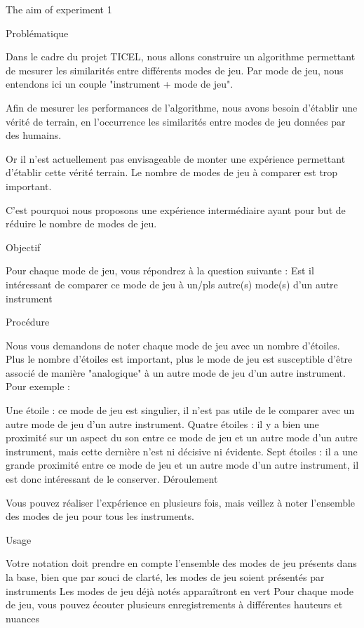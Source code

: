 \documentclass{article}
\begin{document}
The aim of experiment 1

Problématique

Dans le cadre du projet TICEL, nous allons construire un algorithme permettant de mesurer les similarités entre différents modes de jeu. Par mode de jeu, nous entendons ici un couple "instrument + mode de jeu".

Afin de mesurer les performances de l'algorithme, nous avons besoin d'établir une vérité de terrain, en l’occurrence les similarités entre modes de jeu données par des humains.

Or il n'est actuellement pas envisageable de monter une expérience permettant d'établir cette vérité terrain. Le nombre de modes de jeu à comparer est trop important.

C'est pourquoi nous proposons une expérience intermédiaire ayant pour but de réduire le nombre de modes de jeu.

Objectif

Pour chaque mode de jeu, vous répondrez à la question suivante : Est il intéressant de comparer ce mode de jeu à un/pls autre(s) mode(s) d'un autre instrument

Procédure

Nous vous demandons de noter chaque mode de jeu avec un nombre d’étoiles. Plus le nombre d'étoiles est important, plus le mode de jeu est susceptible d'être associé de manière "analogique" à un autre mode de jeu d'un autre instrument. Pour exemple :

Une étoile : ce mode de jeu est singulier, il n’est pas utile de le comparer avec un autre mode de jeu d'un autre instrument.
Quatre étoiles : il y a bien une proximité sur un aspect du son entre ce mode de jeu et un autre mode d'un autre instrument, mais cette dernière n'est ni décisive ni évidente.
Sept étoiles : il a une grande proximité entre ce mode de jeu et un autre mode d'un autre instrument, il est donc intéressant de le conserver.
Déroulement

Vous pouvez réaliser l'expérience en plusieurs fois, mais veillez à noter l'ensemble des modes de jeu pour tous les instruments.

Usage

Votre notation doit prendre en compte l'ensemble des modes de jeu présents dans la base, bien que par souci de clarté, les modes de jeu soient présentés par instruments
Les modes de jeu déjà notés apparaîtront en vert
Pour chaque mode de jeu, vous pouvez écouter plusieurs enregistrements à différentes hauteurs et nuances
\end{document}
